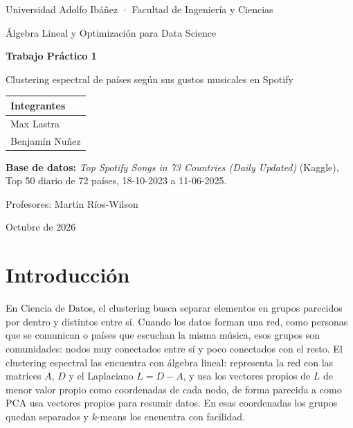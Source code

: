 \documentclass[11pt,a4paper]{article}
\begin{document}
\begin{titlepage}
\centering
{\large Universidad Adolfo Ibáñez · Facultad de Ingeniería y Ciencias\par}
{\large Álgebra Lineal y Optimización para Data Science\par}
\vspace{3cm}
{\Huge\bfseries Trabajo Práctico 1\par}
\vspace{0.5cm}
{\LARGE Clustering espectral de países según sus gustos musicales en Spotify\par}
\vspace{2cm}
\begin{tabular}{l}
\toprule
\textbf{Integrantes}\\
\midrule
Max Lastra\\
Benjamín Nuñez\\
\bottomrule
\end{tabular}
\vspace{1.5cm}

\textbf{Base de datos:} \emph{Top Spotify Songs in 73 Countries (Daily Updated)} (Kaggle),\\
Top 50 diario de 72 países, 18-10-2023 a 11-06-2025.
\vfill
{\large Profesores: Martín Ríos-Wilson\par}
{\large Octubre de 2026\par}
\end{titlepage}

\tableofcontents
\newpage

\section{Introducción}

En Ciencia de Datos, el clustering busca separar elementos en grupos parecidos por dentro y distintos entre sí. Cuando los datos forman una red, como personas que se comunican o países que escuchan la misma música, esos grupos son comunidades: nodos muy conectados entre sí y poco conectados con el resto. El clustering espectral las encuentra con álgebra lineal: representa la red con las matrices $A$, $D$ y el Laplaciano $L=D-A$, y usa los vectores propios de $L$ de menor valor propio como coordenadas de cada nodo, de forma parecida a como PCA usa vectores propios para resumir datos. En esas coordenadas los grupos quedan separados y $k$-means los encuentra con facilidad.
\end{document}
